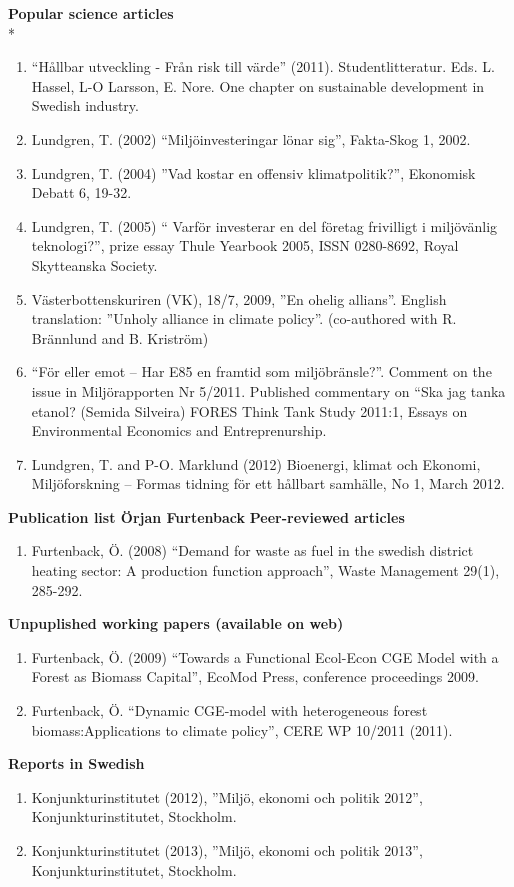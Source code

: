 \documentclass[10pt,a4paper]{article}
\begin{document}
\textbf{Popular science articles}\\*
\begin{enumerate}
	\item “Hållbar utveckling - Från risk till värde” (2011). Studentlitteratur. Eds. L. Hassel, L-O Larsson, E. Nore. One chapter on sustainable development in Swedish industry. 
	\item Lundgren, T. (2002) “Miljöinvesteringar lönar sig”, Fakta-Skog 1, 2002. 
	\item Lundgren, T. (2004) ”Vad kostar en offensiv klimatpolitik?”, Ekonomisk Debatt 6, 19-32. 
	\item Lundgren, T. (2005) “ Varför investerar en del företag frivilligt i miljövänlig teknologi?”, prize essay Thule Yearbook 2005, ISSN 0280-8692, Royal Skytteanska Society. 
	\item Västerbottenskuriren (VK), 18/7, 2009, ”En ohelig allians”. English translation: ”Unholy alliance in climate policy”. (co-authored with R. Brännlund and B. Kriström) 
	\item “För eller emot – Har E85 en framtid som miljöbränsle?”. Comment on the issue in Miljörapporten Nr 5/2011. Published commentary on “Ska jag tanka etanol? (Semida Silveira) FORES Think Tank Study 2011:1, Essays on Environmental Economics and Entreprenurship. 
	\item Lundgren, T. and P-O. Marklund (2012) Bioenergi, klimat och Ekonomi, Miljöforskning – Formas tidning för ett hållbart samhälle, No 1, March 2012. 
\end{enumerate}
 

\textbf{Publication list Örjan Furtenback}
\textbf{Peer-reviewed articles}
\begin{enumerate}
	\item Furtenback, Ö. (2008) “Demand for waste as fuel in the swedish district heating sector: A production function approach”, Waste Management 29(1), 285-292.
\end{enumerate}

\textbf{Unpuplished working papers (available on web)}
\begin{enumerate}
	\item Furtenback, Ö. (2009) “Towards a Functional Ecol-Econ CGE Model with a Forest as Biomass Capital”, EcoMod Press, conference proceedings 2009.
	\item Furtenback, Ö.  “Dynamic CGE-model with heterogeneous forest biomass:Applications to climate policy”, CERE WP 10/2011 (2011).
\end{enumerate}

\textbf{Reports in Swedish}
\begin{enumerate}
	\item Konjunkturinstitutet (2012), ”Miljö, ekonomi och politik 2012”, Konjunkturinstitutet, Stockholm.
	\item Konjunkturinstitutet (2013), ”Miljö, ekonomi och politik 2013”, Konjunkturinstitutet, Stockholm.
\end{enumerate}
 
\end{document}
